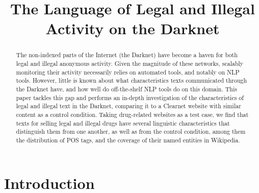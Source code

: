 \documentclass[11pt,a4paper,table]{article}
\title{The Language of Legal and Illegal Activity on the Darknet}
\date{}
\begin{document}
\maketitle

\begin{abstract}
  The non-indexed parts of the Internet (the Darknet)
   have become a haven for both legal and illegal anonymous activity.
  Given the magnitude of these networks, scalably monitoring their activity necessarily relies
    on automated tools, and notably on NLP tools.
  However, little is known about what characteristics texts communicated through the Darknet have, 
    and how well do off-the-shelf NLP tools do on this domain.
  This paper tackles this gap and performs an in-depth investigation of the characteristics
    of legal and illegal text in the Darknet, comparing it to a Clearnet website with similar
    content as a control condition.
  Taking drug-related websites as a test case, we find that texts for selling legal and illegal drugs
    have several linguistic characteristics that distinguish them from one another, as well as from 
    the control condition, among them the distribution of POS tags, and the coverage of their named entities in Wikipedia.
\end{abstract}



\section{Introduction}
\end{document}

